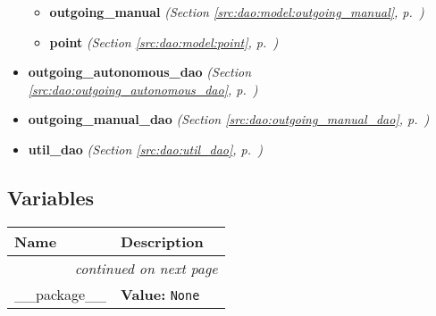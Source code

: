 \begin{itemize}
\begin{itemize}
    \item \textbf{outgoing\_manual}
  \textit{(Section \ref{src:dao:model:outgoing_manual}, p.~\pageref{src:dao:model:outgoing_manual})}

    \item \textbf{point}
  \textit{(Section \ref{src:dao:model:point}, p.~\pageref{src:dao:model:point})}

  \end{itemize}
\item \textbf{outgoing\_autonomous\_dao}
  \textit{(Section \ref{src:dao:outgoing_autonomous_dao}, p.~\pageref{src:dao:outgoing_autonomous_dao})}

\item \textbf{outgoing\_manual\_dao}
  \textit{(Section \ref{src:dao:outgoing_manual_dao}, p.~\pageref{src:dao:outgoing_manual_dao})}

\item \textbf{util\_dao}
  \textit{(Section \ref{src:dao:util_dao}, p.~\pageref{src:dao:util_dao})}

\end{itemize}



  \subsection{Variables}

    \vspace{-1cm}
\hspace{\varindent}\begin{longtable}{|p{\varnamewidth}|p{\vardescrwidth}|l}
\cline{1-2}
\cline{1-2} \centering \textbf{Name} & \centering \textbf{Description}& \\
\cline{1-2}
\endhead\cline{1-2}\multicolumn{3}{r}{\small\textit{continued on next page}}\\\endfoot\cline{1-2}
\endlastfoot\raggedright \_\-\_\-p\-a\-c\-k\-a\-g\-e\-\_\-\_\- & \raggedright \textbf{Value:} 
{\tt None}&\\
\cline{1-2}
\end{longtable}

